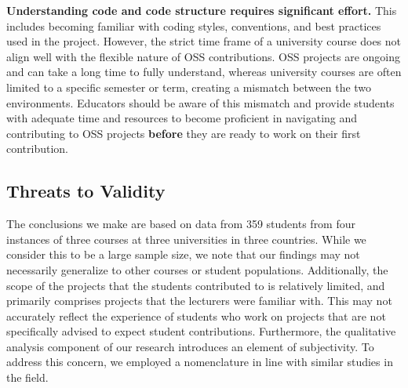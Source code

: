 \documentclass[sigconf]{acmart}
\begin{document}
\begin{sloppy}

\textbf{Understanding code and code structure requires significant effort.} This includes becoming familiar with coding styles, conventions, and best practices used in the project. However, the strict time frame of a university course does not align well with the flexible nature of OSS contributions. OSS projects are ongoing and can take a long time to fully understand, whereas university courses are often limited to a specific semester or term, creating a mismatch between the two environments. Educators should be aware of this mismatch and provide students with adequate time and resources to become proficient in navigating and contributing to OSS projects \textbf{before} they are ready to work on their first contribution.

\subsection{Threats to Validity}

The conclusions we make are based on data from 359 students from four instances of three courses at three universities in three countries. While we consider this to be a large sample size, we note that our findings may not necessarily generalize to other courses or student populations. Additionally, the scope of the projects that the students contributed to is relatively limited, and primarily comprises projects that the lecturers were familiar with. This may not accurately reflect the experience of students who work on projects that are not specifically advised to expect student contributions. Furthermore, the qualitative analysis component of our research introduces an element of subjectivity. To address this concern, we employed a nomenclature in line with similar studies in the field.


\end{sloppy}
\end{document}
